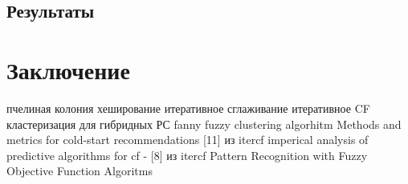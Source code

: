 \documentclass[12pt]{article} %
\begin{document}
\subsection{Результаты}

\section{Заключение}

\newpage
\begin{thebibliography}{99}
 пчелиная колония
 хеширование
 итеративное сглаживание
 итеративное CF
 кластеризация для гибридных РС
 fanny fuzzy clustering algorhitm
 Methods and metrics for cold-start recommendations
 [11] из itercf
 imperical analysis of predictive algorithms for cf - [8] из itercf
 Pattern Recognition with Fuzzy Objective Function Algoritms

\end{thebibliography}
\end{document}
